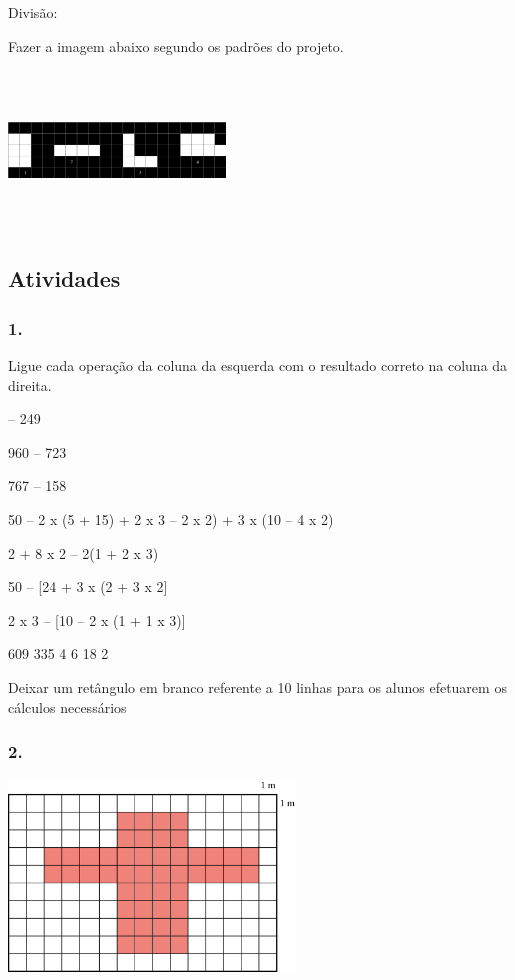 \begin{enumerate}
Divisão:

Fazer a imagem abaixo segundo os padrões do projeto.

\includegraphics[width=2.26923in,height=1.66995in]{media/image31.png}

\subsection{Atividades}\label{atividades-1}

\subsubsection{1.}\label{section-13}

Ligue cada operação da coluna da esquerda com o resultado correto na
coluna da direita.

 -- 249

960 -- 723

767 -- 158

50 -- 2 x (5 + 15) + 2 x 3 -- 2 x 2) + 3 x (10 -- 4 x 2)

2 + 8 x 2 -- 2(1 + 2 x 3)

50 -- {[}24 + 3 x (2 + 3 x 2{]}

2 x 3 -- {[}10 -- 2 x (1 + 1 x 3){]}

609
335
4
6
18
2

Deixar um retângulo em branco referente a 10 linhas para os alunos
efetuarem os cálculos necessários

\subsubsection{2.}\label{section-14}

\includegraphics[width=3.00000in,height=2.02528in]{media/image32.png}


\end{enumerate}
